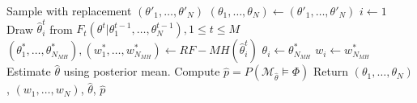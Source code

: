 \begin{algorithm}[H]
\begin{algorithmic}[1]
        \EndWhile
        \State Sample with replacement $(\theta'_1,\ldots,\theta'_N)$ 
        \State $(\theta_1,\ldots,\theta_N) \leftarrow (\theta'_1,\ldots,\theta'_N)$
        \State $i \leftarrow 1$
         
        \State Draw $\hat{\theta}^t_i$ from $F_t(\theta^t | \theta^{t-1}_1,\ldots,\theta^{t-1}_N), 1\leq t \leq M$
        \State $(\theta^*_1,\ldots,\theta^*_{N_{MH}}), (w^*_1,\ldots,w^*_{N_{MH}}) \leftarrow RF-MH(\hat{\theta}^t_i)$
        \State $\theta_i \leftarrow \theta^*_{N_{MH}}$
        \State $w_i \leftarrow w^*_{N_{MH}}$
        \EndWhile
        \EndWhile
        \State Estimate $\hat{\theta}$ using posterior mean.
        \State Compute $\hat{p}=P(\mathcal{M}_{\hat{\theta}} \models\Phi)$
        \State Return $(\theta_1,\ldots,\theta_{N})$, $(w_1,\ldots,w_{N})$, $\hat{\theta}$, $\hat{p}$
        \EndProcedure
    \end{algorithmic}
\end{algorithm}



